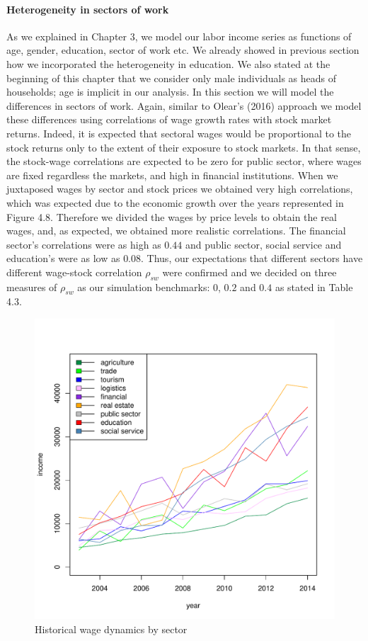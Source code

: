 \documentclass[]{elsarticle}
\begin{document}
\paragraph{Heterogeneity in sectors of work}

As we explained in Chapter 3, we model our labor income series as functions of age, gender, education, sector of work etc. We already showed in previous section how we incorporated the heterogeneity in education. We also stated at the beginning of this chapter that we consider only male individuals as heads of households; age is implicit in our analysis. In this section we will model the differences in sectors of work. Again, similar to Olear's (2016) approach we model these differences using correlations of wage growth rates with stock market returns. Indeed, it is expected that sectoral wages would be proportional to the stock returns only to the extent of their exposure to stock markets. In that sense, the stock-wage correlations are expected to be zero for public sector, where wages are fixed regardless the markets, and high in financial institutions. When we juxtaposed wages by sector and stock prices we obtained very high correlations, which was expected due to the economic growth over the years represented in Figure 4.8. Therefore we divided the wages by price levels to obtain the real wages, and, as expected, we obtained more realistic correlations. The financial sector's correlations were as high as $0.44$  and public sector, social service and education's were as low as $0.08$. Thus, our expectations that different sectors have different wage-stock correlation $\rho_{sw}$ were confirmed and we decided on three measures of $\rho_{sw}$ as our simulation benchmarks: $0$, $0.2$ and $0.4$ as stated in Table 4.3.

\begin{figure}[h]
	\centering
	\includegraphics[scale=0.6]{figs/wage2sec.pdf}
	\caption{Historical wage dynamics by sector}
\end{figure}
\end{document}
